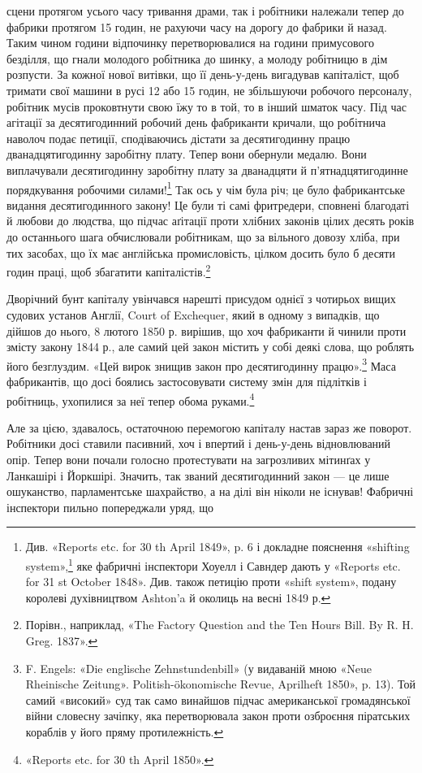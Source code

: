 \parcont{}  %
сцени протягом усього часу тривання драми, так і робітники належали
тепер до фабрики протягом 15 годин, не рахуючи часу на
дорогу до фабрики й назад. Таким чином години відпочинку перетворювалися
на години примусового безділля, що гнали молодого
робітника до шинку, а молоду робітницю в дім розпусти. За
кожної нової витівки, що її день-у-день вигадував капіталіст,
щоб тримати свої машини в русі 12 або 15 годин, не збільшуючи
робочого персоналу, робітник мусів проковтнути свою їжу то в
той, то в інший шматок часу. Під час агітації за десятигодинний
робочий день фабриканти кричали, що робітнича наволоч подає
петиції, сподіваючись дістати за десятигодинну працю дванадцятигодинну
заробітну плату. Тепер вони обернули медалю. Вони
виплачували десятигодинну заробітну плату за дванадцяти й
п’ятнадцятигодинне порядкування робочими силами!\footnote{
Див. «Reports etc. for 30 th April 1849», p. 6 і докладне пояснення
«shifting system»,\footnote*{
— системи пересувань. Ред.
} яке фабричні інспектори Хоуелл і Савндер дають
у «Reports etc. for 31 st October 1848». Див. також петицію проти
«shift system», подану королеві духівництвом Ashton’a й околиць на весні
1849 р.
} Так ось
у чім була річ; це було фабрикантське видання десятигодинного
закону! Це були ті самі фритредери, сповнені благодаті й любови
до людства, що підчас аґітації проти хлібних законів цілих десять
років до останнього шага обчислювали робітникам, що за вільного
довозу хліба, при тих засобах, що їх має англійська промисловість,
цілком досить було б десяти годин праці, щоб збагатити
капіталістів.\footnote{
Порівн., наприклад, «The Factory Question and the Ten Hours
Bill. By R. H. Greg. 1837».
}

Дворічний бунт капіталу увінчався нарешті присудом однієї
з чотирьох вищих судових установ Англії, Court of Exchequer,
який в одному з випадків, що дійшов до нього, 8 лютого 1850 р.
вирішив, що хоч фабриканти й чинили проти змісту закону
1844 р., але самий цей закон містить у собі деякі слова, що роблять
його безглуздим. «Цей вирок знищив закон про десятигодинну
працю».\footnote{
F. Engels: «Die englische Zehnstundenbill» (у видаваній мною
«Neue Rheinische Zeitung». Politish-ökonomische Revue, Aprilheft
1850», p. 13). Той самий «високий» суд так само винайшов підчас американської
громадянської війни словесну зачіпку, яка перетворювала закон
проти озброєння піратських кораблів у його пряму протилежність.
} Маса фабрикантів, що досі боялись застосовувати
систему змін для підлітків і робітниць, ухопилися за неї тепер
обома руками.\footnote{
«Reports etc. for 30 th April 1850».
}

Але за цією, здавалось, остаточною перемогою капіталу
настав зараз же поворот. Робітники досі ставили пасивний, хоч
і впертий і день-у-день відновлюваний опір. Тепер вони почали
голосно протестувати на загрозливих мітинґах у Ланкашірі і
Йоркшірі. Значить, так званий десятигодинний закон — це лише
ошуканство, парламентське шахрайство, а на ділі він ніколи не
існував! Фабричні інспектори пильно попереджали уряд, що
\parbreak{}  %
